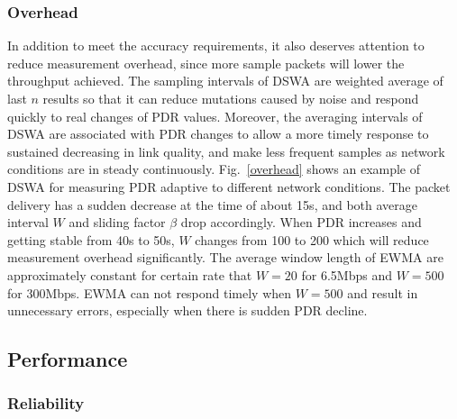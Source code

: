 \documentclass[draftclsnofoot,journal,onecolumn,11pt]{IEEEtran}
\begin{document}
\subsubsection{Overhead}
In addition to meet the accuracy requirements, it also deserves attention to reduce measurement overhead, since more sample packets will lower the throughput achieved. The sampling intervals of DSWA are weighted average of last $n$ results so that it can reduce mutations caused by noise and respond quickly to real changes of PDR values. Moreover, the averaging intervals of DSWA are associated with PDR changes to allow a more timely response to sustained decreasing in link quality, and make less frequent samples as network conditions are in steady continuously. Fig.~\ref{overhead} shows an example of DSWA for measuring PDR adaptive to different network conditions. The packet delivery has a sudden decrease at the time of about 15s, and both average interval $W$ and sliding factor $\beta$ drop accordingly. When PDR increases and getting stable from 40s to 50s, $W$ changes from 100 to 200 which will reduce measurement overhead significantly. The average window length of EWMA are approximately constant for certain rate that $W=20$ for 6.5Mbps and $W=500$ for 300Mbps. EWMA can not respond timely when $W=500$ and result in unnecessary errors, especially when there is sudden PDR decline.

\subsection{Performance}

\subsubsection{Reliability}
\end{document}
